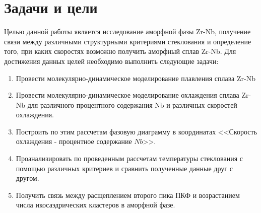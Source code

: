 \section{Задачи и цели}
Целью данной работы является исследование аморфной фазы Zr-Nb, получение связи между различными структурными критериями стеклования и определение того, при каких скоростях возможно получить аморфный сплав Zr-Nb.
Для достижения данных целей необходимо выполнить следующие задачи:
\begin{enumerate}
	\item Провести молекулярно-динамическое моделирование плавления сплава Zr-Nb
	\item Провести молекулярно-динамическое моделирование охлаждения сплава Zr-Nb для различного процентного содержания Nb и различных скоростей охлаждения.
	\item Построить по этим рассчетам фазовую диаграмму в координатах <<Скорость охлаждения - процентное содержание $Nb$>>.
	\item Проанализировать по проведенным рассчетам температуры стеклования с помощью различных критериев и сравнить полученные данные друг с другом.
	\item Получить связь между расщеплением второго пика ПКФ и возрастанием числа икосаэдрических кластеров в аморфной фазе. 
\end{enumerate}



